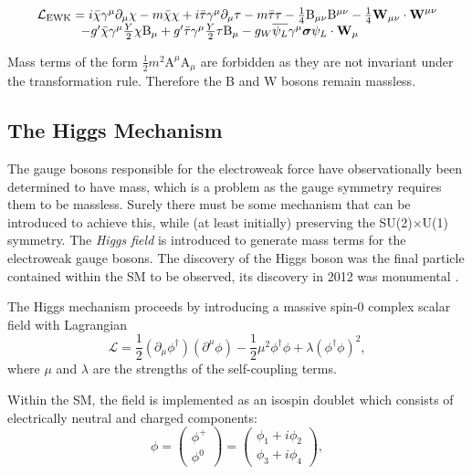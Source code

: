 \begin{equation}
\begin{array}{l}
\mathcal{L}_{\mathrm{EWK}} = 
i \bar{\chi} \gamma^{\mu} \partial_{\mu} \chi - m \bar{\chi} \chi
+ i \bar{\tau}   \gamma^{\mu}    \partial_{\mu} \tau  - m \bar{\tau} \tau
- \frac{1}{4}\mathrm{B}_{\mu\nu}\mathrm{B}^{\mu\nu}
-\frac{1}{4}\bm{\mathrm{W}}_{\mu\nu} \cdot \bm{\mathrm{W}}^{\mu\nu} \\
\hspace{1.2cm}
-  g' \bar{\chi} \gamma^{\mu} \frac{Y}{2} \chi \mathrm{B}_{\mu} + g' \bar{\tau} \gamma^{\mu} \frac{Y}{2} \tau \mathrm{B}_{\mu}
- g_W  \overline{\psi_{L}} \gamma^{\mu} \bm{\sigma} \psi_{L} \cdot \bm{\mathrm{W}}_{\mu}
\end{array}
\end{equation}

Mass terms of the form $\frac{1}{2}m^{2}\mathrm{A}^{\mu}\mathrm{A}_{\mu}$ are forbidden as they are not invariant under the transformation rule. Therefore the B and $\bm{\mathrm{W}}$ bosons remain massless.

\subsection{The Higgs Mechanism}

The gauge bosons responsible for the electroweak force have observationally been determined to have mass, which is a problem as the gauge symmetry requires them to be massless. Surely there must be some mechanism that can be introduced to achieve this, while (at least initially) preserving the SU(2)$\times$U(1) symmetry. The \textit{Higgs field} is introduced to generate mass terms for the electroweak gauge bosons. The discovery of the Higgs boson was the final particle contained within the SM to be observed, its discovery in 2012 was monumental \cite{higgsdisc}.

The Higgs mechanism proceeds by introducing a massive spin-0 complex scalar field with Lagrangian
\begin{equation}
\label{higgslag}
\mathcal{L} = \frac{1}{2} (\partial_{\mu}\phi^{\dagger})(\partial^{\mu}\phi) - \frac{1}{2}\mu^{2} \phi^{\dagger}\phi + \lambda(\phi^{\dagger}\phi)^{2},
\end{equation}
where $\mu$ and $\lambda$ are the strengths of the self-coupling terms.

Within the SM, the field is implemented as an isospin doublet which consists of electrically neutral and charged components:
\begin{equation}
\phi = \begin{pmatrix} \phi^{+} \\ \phi^{0} \end{pmatrix} = \begin{pmatrix} \phi_{1} + i\phi_{2} \\  \phi_{3} + i\phi_{4} \end{pmatrix},
\end{equation}

